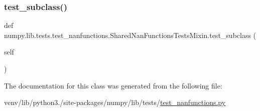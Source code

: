 \subsubsection{\texorpdfstring{test\+\_\+subclass()}{test\_subclass()}}
{\footnotesize\ttfamily def numpy.\+lib.\+tests.\+test\+\_\+nanfunctions.\+Shared\+Nan\+Functions\+Tests\+Mixin.\+test\+\_\+subclass (\begin{DoxyParamCaption}\item[{}]{self }\end{DoxyParamCaption})}



The documentation for this class was generated from the following file\+:\begin{DoxyCompactItemize}
\item 
venv/lib/python3./site-\/packages/numpy/lib/tests/\hyperlink{test__nanfunctions_8py}{test\+\_\+nanfunctions.\+py}\end{DoxyCompactItemize}
